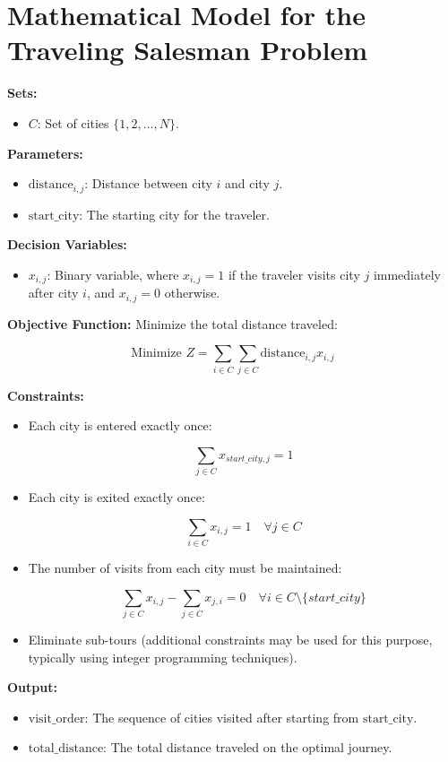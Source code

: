 \documentclass{article}
\begin{document}
\section*{Mathematical Model for the Traveling Salesman Problem}

\textbf{Sets:}
\begin{itemize}
    \item \( C \): Set of cities \( \{ 1, 2, \ldots, N \} \).
\end{itemize}

\textbf{Parameters:}
\begin{itemize}
    \item \( \text{distance}_{i,j} \): Distance between city \( i \) and city \( j \).
    \item \( \text{start\_city} \): The starting city for the traveler.
\end{itemize}

\textbf{Decision Variables:}
\begin{itemize}
    \item \( x_{i,j} \): Binary variable, where \( x_{i,j} = 1 \) if the traveler visits city \( j \) immediately after city \( i \), and \( x_{i,j} = 0 \) otherwise.
\end{itemize}

\textbf{Objective Function:}
Minimize the total distance traveled:

\[
\text{Minimize } Z = \sum_{i \in C} \sum_{j \in C} \text{distance}_{i,j} x_{i,j}
\]

\textbf{Constraints:}
\begin{itemize}
    \item Each city is entered exactly once:

    \[
    \sum_{j \in C} x_{start\_city,j} = 1
    \]

    \item Each city is exited exactly once:

    \[
    \sum_{i \in C} x_{i,j} = 1 \quad \forall j \in C
    \]

    \item The number of visits from each city must be maintained:

    \[
    \sum_{j \in C} x_{i,j} - \sum_{j \in C} x_{j,i} = 0 \quad \forall i \in C \setminus \{start\_city\}
    \]

    \item Eliminate sub-tours (additional constraints may be used for this purpose, typically using integer programming techniques).
\end{itemize}

\textbf{Output:}
\begin{itemize}
    \item \( \text{visit\_order} \): The sequence of cities visited after starting from \( \text{start\_city} \).
    \item \( \text{total\_distance} \): The total distance traveled on the optimal journey.
\end{itemize}
\end{document}
